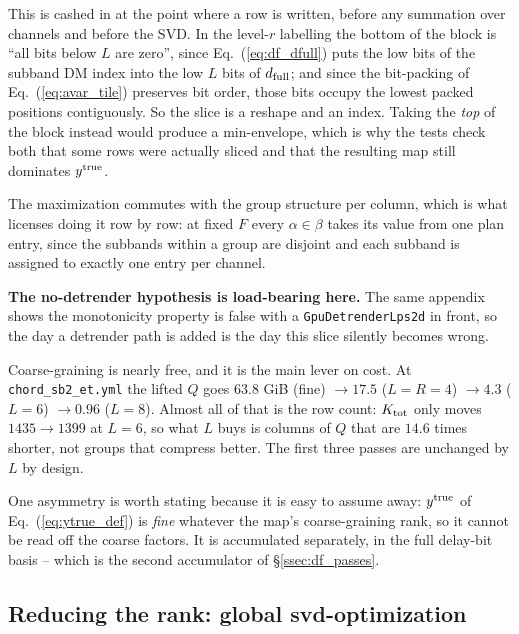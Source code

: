 \documentclass{article}
\numberwithin{equation}{section}   %
\begin{document}
This is cashed in at the point where a row is written, before any summation over channels and
before the SVD. In the level-$r$ labelling the bottom of the block is ``all bits below $L$ are
zero'', since Eq.\ (\ref{eq:df_dfull}) puts the low bits of the subband DM index into the low $L$
bits of $d_{\rm full}$; and since the bit-packing of Eq.\ (\ref{eq:avar_tile}) preserves bit
order, those bits occupy the lowest packed positions contiguously. So the slice is a reshape and
an index. Taking the {\em top} of the block instead would produce a min-envelope, which is why
the tests check both that some rows were actually sliced and that the resulting map still
dominates $y^{\rm true}$.

The maximization commutes with the group structure per column, which is what licenses doing it
row by row: at fixed $F$ every $\alpha \in \beta$ takes its value from one plan entry, since the
subbands within a group are disjoint and each subband is assigned to exactly one entry per
channel.

{\bf The no-detrender hypothesis is load-bearing here.} The same appendix shows the monotonicity
property is false with a {\tt GpuDetrenderLps2d} in front, so the day a detrender path is added is the
day this slice silently becomes wrong.

Coarse-graining is nearly free, and it is the main lever on cost. At {\tt chord\_sb2\_et.yml} the
lifted $Q$ goes $63.8$ GiB (fine) $\rightarrow 17.5$ ($L = R = 4$) $\rightarrow 4.3$ ($L=6$)
$\rightarrow 0.96$ ($L=8$). Almost all of that is the row count: $K_{\rm tot}$ only moves
$1435 \rightarrow 1399$ at $L=6$, so what $L$ buys is columns of $Q$ that are $14.6$ times
shorter, not groups that compress better. The first three passes are unchanged by $L$ by design.

One asymmetry is worth stating because it is easy to assume away: $y^{\rm true}$ of
Eq.\ (\ref{eq:ytrue_def}) is {\em fine} whatever the map's coarse-graining rank, so it cannot be
read off the coarse factors. It is accumulated separately, in the full delay-bit basis -- which is
the second accumulator of \S\ref{ssec:df_passes}.

\subsection{Reducing the rank: global svd-optimization}
\label{ssec:df_svdopt}
\end{document}
